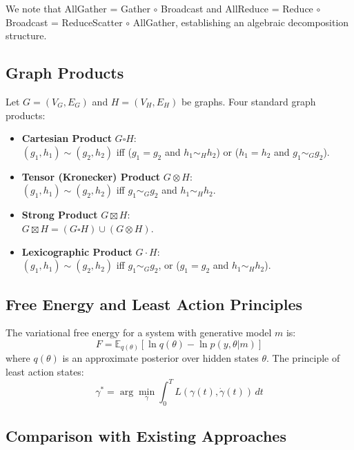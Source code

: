 \documentclass[12pt]{article}
\begin{document}
We note that AllGather = Gather $\circ$ Broadcast and
AllReduce = Reduce $\circ$ Broadcast = ReduceScatter $\circ$ AllGather,
establishing an algebraic decomposition structure.

\subsection{Graph Products}

Let $G = (V_G, E_G)$ and $H = (V_H, E_H)$ be graphs. Four standard
graph products:
\begin{itemize}
\item \textbf{Cartesian Product} $G \square H$: \\
$(g_1, h_1) \sim (g_2, h_2)$ iff ($g_1 = g_2$ and $h_1 \sim_H h_2$)
or ($h_1 = h_2$ and $g_1 \sim_G g_2$).
\item \textbf{Tensor (Kronecker) Product} $G \otimes H$: \\
$(g_1, h_1) \sim (g_2, h_2)$ iff $g_1 \sim_G g_2$ and $h_1 \sim_H h_2$.
\item \textbf{Strong Product} $G \boxtimes H$: \\
$G \boxtimes H = (G \square H) \cup (G \otimes H)$.
\item \textbf{Lexicographic Product} $G \cdot H$: \\
$(g_1, h_1) \sim (g_2, h_2)$ iff $g_1 \sim_G g_2$, or
($g_1 = g_2$ and $h_1 \sim_H h_2$).
\end{itemize}

\subsection{Free Energy and Least Action Principles}

The variational free energy for a system with generative model $m$ is:
\begin{equation}
F = \mathbb{E}_{q(\theta)}[\ln q(\theta) - \ln p(y, \theta | m)]
\end{equation}
where $q(\theta)$ is an approximate posterior over hidden states
$\theta$. The principle of least action states:
\begin{equation}
\gamma^* = \arg\min_\gamma \int_0^T L(\gamma(t), \dot{\gamma}(t)) \, dt
\end{equation}

\subsection{Comparison with Existing Approaches}
\end{document}

